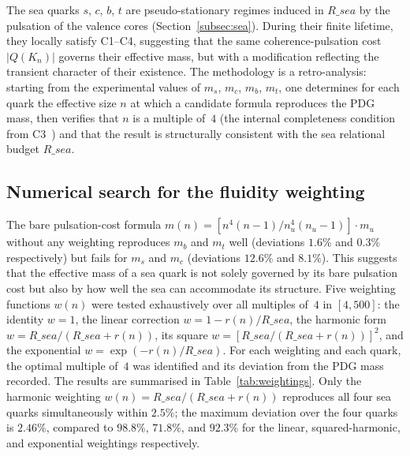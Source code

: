\documentclass[12pt,a4paper]{article}
\def\Rsea{R\_sea}
\def\QQ{Q}
\theoremstyle{plain}
\theoremstyle{definition}
\theoremstyle{remark}
\newcommand{\nnu}{n_u}
\newcommand{\Rsea}{R_{\mathrm{sea}}}
\newcommand{\mup}{m_u}
\newcommand{\mstrange}{m_s}
\newcommand{\mcharm}{m_c}
\newcommand{\mbottom}{m_b}
\newcommand{\mtop}{m_t}
\newcommand{\QQ}{\mathcal{Q}}
\begin{document}
The sea quarks $s$, $c$, $b$, $t$ are pseudo-stationary regimes induced in $\Rsea$ by the pulsation of the valence cores (Section~\ref{subsec:sea}). During their finite lifetime, they locally satisfy C1--C4, suggesting that the same coherence-pulsation cost $|\QQ(K_n)|$ governs their effective mass, but with a modification reflecting the transient character of their existence. The methodology is a retro-analysis: starting from the experimental values of $\mstrange$, $\mcharm$, $\mbottom$, $\mtop$, one determines for each quark the effective size $n$ at which a candidate formula reproduces the PDG mass, then verifies that $n$ is a multiple of~$4$ (the internal completeness condition from C3~\cite{D01,D16a}) and that the result is structurally consistent with the sea relational budget $\Rsea$.

\subsection{Numerical search for the fluidity weighting}
\label{subsec:search_sea}

The bare pulsation-cost formula $m(n) = [n^4(n-1)/\nnu^4(\nnu-1)] \cdot \mup$ without any weighting reproduces $\mbottom$ and $\mtop$ well (deviations $1.6\%$ and $0.3\%$ respectively) but fails for $\mstrange$ and $\mcharm$ (deviations $12.6\%$ and $8.1\%$). This suggests that the effective mass of a sea quark is not solely governed by its bare pulsation cost but also by how well the sea can accommodate its structure. Five weighting functions $w(n)$ were tested exhaustively over all multiples of~$4$ in $[4, 500]$: the identity $w = 1$, the linear correction $w = 1 - r(n)/\Rsea$, the harmonic form $w = \Rsea/(\Rsea + r(n))$, its square $w = [\Rsea/(\Rsea + r(n))]^2$, and the exponential $w = \exp(-r(n)/\Rsea)$. For each weighting and each quark, the optimal multiple of~$4$ was identified and its deviation from the PDG mass recorded. The results are summarised in Table~\ref{tab:weightings}. Only the harmonic weighting $w(n) = \Rsea/(\Rsea + r(n))$ reproduces all four sea quarks simultaneously within $2.5\%$; the maximum deviation over the four quarks is $2.46\%$, compared to $98.8\%$, $71.8\%$, and $92.3\%$ for the linear, squared-harmonic, and exponential weightings respectively.
\end{document}
